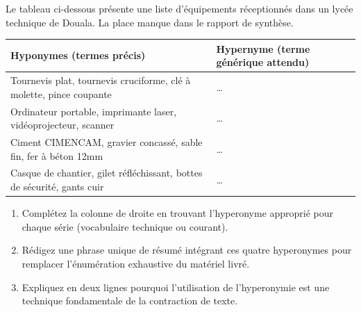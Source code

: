 \documentclass[11pt]{article}
\begin{document}
\begin{exercice}
Le tableau ci-dessous présente une liste d'équipements réceptionnés dans un lycée technique de Douala. La place manque dans le rapport de synthèse.

\begin{center}
\begin{tabular}{|l|l|}
\hline
\textbf{Hyponymes (termes précis)} & \textbf{Hypernyme (terme générique attendu)} \\
\hline
Tournevis plat, tournevis cruciforme, clé à molette, pince coupante & \ldots \\
\hline
Ordinateur portable, imprimante laser, vidéoprojecteur, scanner & \ldots \\
\hline
Ciment CIMENCAM, gravier concassé, sable fin, fer à béton 12mm & \ldots \\
\hline
Casque de chantier, gilet réfléchissant, bottes de sécurité, gants cuir & \ldots \\
\hline
\end{tabular}
\end{center}

\begin{enumerate}
    \item Complétez la colonne de droite en trouvant l'hyperonyme approprié pour chaque série (vocabulaire technique ou courant).
    \item Rédigez une phrase unique de résumé intégrant ces quatre hyperonymes pour remplacer l'énumération exhaustive du matériel livré.
    \item Expliquez en deux lignes pourquoi l'utilisation de l'hyperonymie est une technique fondamentale de la contraction de texte.
\end{enumerate}
\end{exercice}
\end{document}
